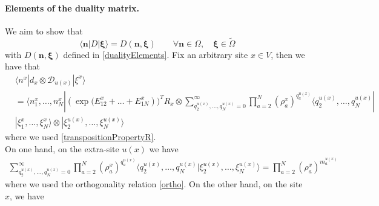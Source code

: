 \documentclass[11pt]{article}
\numberwithin{equation}{section}
\numberwithin{equation}{subsection}
\newcommand{\dd}{\mathcal{D}_{u(x)}}
\begin{document}
\paragraph{Elements of the duality matrix.}We aim to show that 
\begin{equation}\label{proofDualityElements}
\langle \bm{n}|D|\bm{\xi}\rangle=D(\bm{n},\bm{\xi})\qquad   \forall \bm{n}\in \Omega,\quad \bm{\xi}\in \widetilde{\Omega}
\end{equation}
with $D(\bm{n},\bm{\xi})$ defined in \eqref{dualityElements}. 
Fix an arbitrary site $x\in V$, then we have that 
\begin{align*}
	 &\langle n^{x}|d_{x}\otimes \dd|\xi^{x}\rangle\\&=\langle n_{1}^{x},\ldots,n_{N}^{x}| (\exp{(E_{12}^{x}+\ldots+E_{1N}^{x}}))^{T}R_{x}\otimes\sum_{q_{2}^{u(x)},\ldots,q_{N}^{u(x)}=0}^{\infty}\prod_{a=2}^{N}\left(\rho_{a}^{x}\right)^{q_{a}^{u(x)}}\langle q_{2}^{u(x)},\ldots,q_{N}^{u(x)}|
	 \\&|\xi_{1}^{x},\ldots,\xi_{N}^{x}\rangle \otimes |\xi_{2}^{u(x)},\ldots,\xi_{N}^{u(x)}\rangle
\end{align*}
where we used \eqref{transpositionPropertyR}. \\
On one hand, on the extra-site $u(x)$ we have 
\begin{align*}
\sum_{q_{2}^{u(x)},\ldots,q_{N}^{u(x)}=0}^{\infty}\prod_{a=2}^{N}\left(\rho_{a}^{x}\right)^{q_{a}^{u(x)}}\langle q_{2}^{u(x)},\ldots,q_{N}^{u(x)}|\xi_{2}^{u(x)},\ldots,\xi_{N}^{u(x)}\rangle=\prod_{a=2}^{N}\left(\rho_{a}^{x}\right)^{m_{a}^{u(x)}}
\end{align*}
where we used the orthogonality relation \eqref{ortho}. 
On the other hand, on the site $x$, we have 
\end{document}
